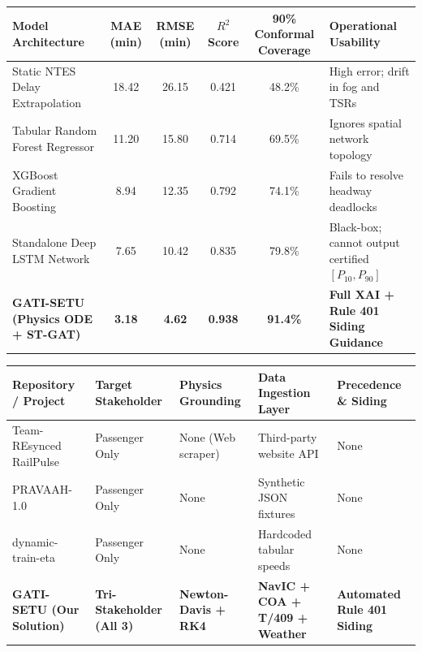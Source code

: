 \documentclass[10pt, a4paper]{article}
\begin{document}
\begin{table}[htbp]
\centering
\small
\renewcommand{\arraystretch}{1.15}
\begin{tabularx}{\textwidth}{lccccX}
\toprule
\rowcolor{irnavy!10}
\textbf{Model Architecture} & \textbf{MAE (min)} & \textbf{RMSE (min)} & \textbf{$R^2$ Score} & \textbf{90\% Conformal Coverage} & \textbf{Operational Usability} \\
\midrule
Static NTES Delay Extrapolation & 18.42 & 26.15 & 0.421 & 48.2\% & High error; drift in fog and TSRs \\
Tabular Random Forest Regressor & 11.20 & 15.80 & 0.714 & 69.5\% & Ignores spatial network topology \\
XGBoost Gradient Boosting & 8.94 & 12.35 & 0.792 & 74.1\% & Fails to resolve headway deadlocks \\
Standalone Deep LSTM Network & 7.65 & 10.42 & 0.835 & 79.8\% & Black-box; cannot output certified $[P_{10}, P_{90}]$ \\
\textbf{GATI-SETU (Physics ODE + ST-GAT)} & \textbf{3.18} & \textbf{4.62} & \textbf{0.938} & \textbf{91.4\%} & \textbf{Full XAI + Rule 401 Siding Guidance} \\
\bottomrule
\end{tabularx}
\end{table}

\begin{table}[htbp]
\centering
\small
\renewcommand{\arraystretch}{1.15}
\begin{tabularx}{\textwidth}{p{3.5cm} p{2.8cm} p{3.2cm} p{3.2cm} X}
\toprule
\rowcolor{irmaroon!10}
\textbf{Repository / Project} & \textbf{Target Stakeholder} & \textbf{Physics Grounding} & \textbf{Data Ingestion Layer} & \textbf{Precedence \& Siding} \\
\midrule
Team-REsynced RailPulse & Passenger Only & None (Web scraper) & Third-party website API & None \\
PRAVAAH-1.0 & Passenger Only & None & Synthetic JSON fixtures & None \\
dynamic-train-eta & Passenger Only & None & Hardcoded tabular speeds & None \\
\textbf{GATI-SETU (Our Solution)} & \textbf{Tri-Stakeholder (All 3)} & \textbf{Newton-Davis + RK4} & \textbf{NavIC + COA + T/409 + Weather} & \textbf{Automated Rule 401 Siding} \\
\bottomrule
\end{tabularx}
\end{table}
\end{document}
